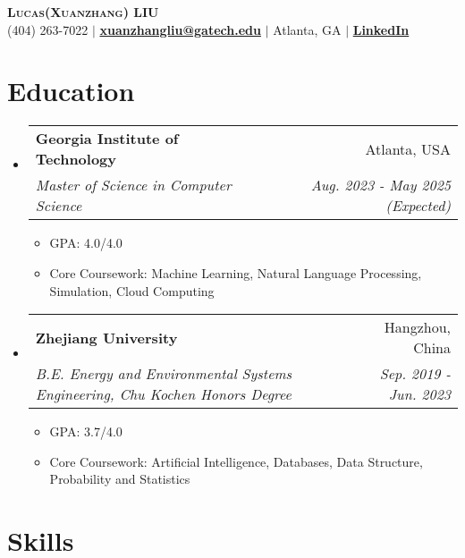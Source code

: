 \documentclass{exam}
\makeatletter
\newcommand{\ResumeItem}[1]{
  \item\small{
    {#1 \vspace{-2pt}}
  }
}
\newcommand{\ResumeSubheadingBNII}[4]{
  \vspace{-2pt}\item
    \begin{tabular*}{0.97\textwidth}[t]{l@{\extracolsep{\fill}}r}
      \textbf{#1} & #2 \\
      \textit{#3} & \textit{ #4} \\
    \end{tabular*}\vspace{-7pt}
}
\newcommand{\ResumeSubheadingListStart}{\begin{itemize}[leftmargin=0.15in, label={}]}
\newcommand{\ResumeSubheadingListEnd}{\end{itemize}}
\newcommand{\ResumeItemListStart}{\begin{itemize}}
\newcommand{\ResumeItemListEnd}{\end{itemize}\vspace{-5pt}}
\makeatother
\begin{document}




\hypersetup{
    colorlinks=true,
    linkcolor=black, %
    citecolor=black, %
    filecolor=black, %
    urlcolor=black   %
}


\begin{center}
	\textbf{\huge \scshape Lucas(Xuanzhang) LIU} \\ \vspace{1pt}
	\small (404) 263-7022  $|$
        \href{mailto:xuanzhangliu@gatech.edu}
        {\textbf{xuanzhangliu@gatech.edu}} $|$
        Atlanta, GA $|$
        \href{https://linkedin.com/in/xuanzhangliu}
        {\textbf{LinkedIn} 
        \iffalse \textbf{linkedin.com/in/xuanzhangliu}\fi}
\end{center}



\section{Education}
\ResumeSubheadingListStart
\ResumeSubheadingBNII
{Georgia Institute of Technology}{Atlanta, USA}
{Master of Science in Computer Science }
{Aug. 2023  - May 2025 (Expected)}
\ResumeItemListStart
\ResumeItem{GPA:  4.0/4.0}
\ResumeItem{Core Coursework: Machine Learning, Natural Language Processing, Simulation, Cloud Computing}
\ResumeItemListEnd

\ResumeSubheadingBNII
{Zhejiang University}{Hangzhou, China}
{B.E. Energy and Environmental Systems Engineering, Chu Kochen Honors Degree}{Sep. 2019 - Jun. 2023}
\ResumeItemListStart

\ResumeItem{GPA: 3.7/4.0}
\ResumeItem{Core Coursework: Artificial Intelligence, Databases, Data Structure, Probability and Statistics}
\ResumeItemListEnd

\ResumeSubheadingListEnd





\section{Skills}
\end{document}
